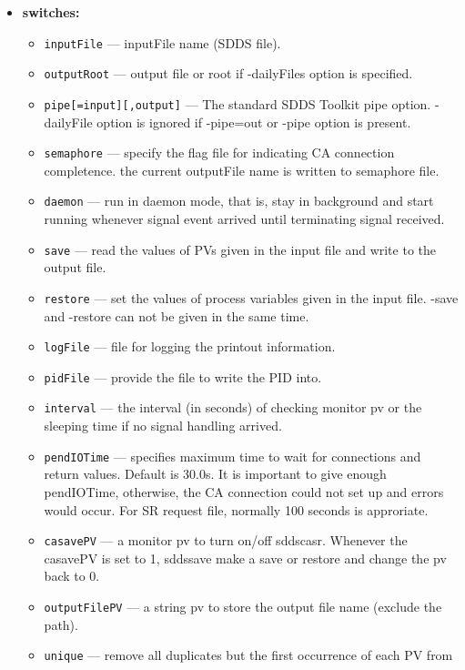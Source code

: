 \begin{itemize}
%
\item {\bf switches:}
%
%
    \begin{itemize}
    \item {\tt inputFile} --- inputFile name (SDDS file).
    \item {\tt outputRoot} --- output file or root if -dailyFiles option is specified.
    \item {\tt pipe[=input][,output]} --- The standard SDDS Toolkit pipe option.
         -dailyFile option is ignored if -pipe=out or -pipe option is present.
    \item {\tt semaphore} --- specify the flag file for indicating CA connection completence.
               the current outputFile name is written to semaphore file.
    \item {\tt daemon} --- run in daemon mode, that is, stay in background and start 
          running whenever signal event arrived until terminating signal received.
    \item {\tt save} --- read the values of PVs given in the input file and write
               to the output file.
    \item {\tt restore} --- set the values of process variables given in the input file.
               -save and -restore can not be given in the same time.
    \item {\tt logFile} --- file for logging the printout information.
    \item {\tt pidFile} --- provide the file to write the PID into.
    \item {\tt interval} --- the interval (in seconds) of checking monitor pv 
               or the sleeping time if no signal handling arrived. 
    \item {\tt pendIOTime} --- specifies maximum time to wait for connections and
               return values. Default is 30.0s. It is important to give enough pendIOTime,
               otherwise, the CA connection could not set up and errors would occur. For SR
               request file, normally 100 seconds is approriate.
    \item {\tt casavePV} --- a monitor pv to turn on/off sddscasr. Whenever the casavePV is 
               set to 1, sddssave make a save or restore and change the pv back to 0.
    \item {\tt outputFilePV} --- a string pv to store the output file name (exclude the path).
    \item {\tt unique} --- remove all duplicates but the first occurrence of each PV from

\end{itemize}
\end{itemize}
